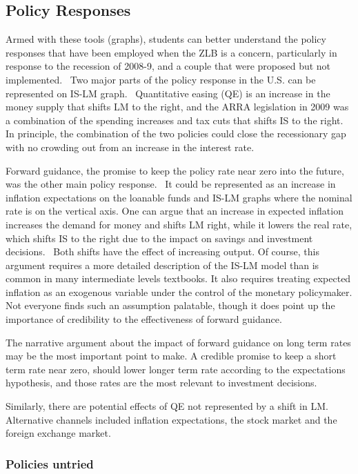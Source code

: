 \documentclass{article}
\begin{document}
\begin{doublespace}
\subsection{Policy Responses}

Armed with these tools (graphs), students can better understand the policy
responses that have been employed when the ZLB is a concern, particularly in
response to the recession of 2008-9, and a couple that were proposed but not
implemented. \ Two major parts of the policy response in the U.S. can be
represented on IS-LM graph. \ Quantitative easing (QE) is an increase in the
money supply that shifts LM to the right, and the ARRA legislation in 2009
was a combination of the spending increases and tax cuts that shifts IS to
the right. In principle, the combination of the two policies could close the
recessionary gap with no crowding out from an increase in the interest rate.
\ 

Forward guidance, the promise to keep the policy rate near zero into the
future, was the other main policy response. \ It could be represented as an
increase in inflation expectations on the loanable funds and IS-LM graphs
where the nominal rate is on the vertical axis. One can argue that an
increase in expected inflation increases the demand for money and shifts LM
right, while it lowers the real rate, which shifts IS to the right due to
the impact on savings and investment decisions. \ Both shifts have the
effect of increasing output. Of course, this argument requires a more
detailed description of the IS-LM model than is common in many intermediate
levels textbooks. It also requires treating expected inflation as an
exogenous variable under the control of the monetary policymaker. Not
everyone finds such an assumption palatable, though it does point up the
importance of credibility to the effectiveness of forward guidance.

The narrative argument about the impact of forward guidance on long term
rates may be the most important point to make. A credible promise to keep a
short term rate near zero, should lower longer term rate according to the
expectations hypothesis, and those rates are the most relevant to investment
decisions. \ 

Similarly, there are potential effects of QE not represented by a shift in
LM. Alternative channels included inflation expectations, the stock market
and the foreign exchange market.

\subsubsection{Policies untried}


\end{doublespace}
\end{document}
